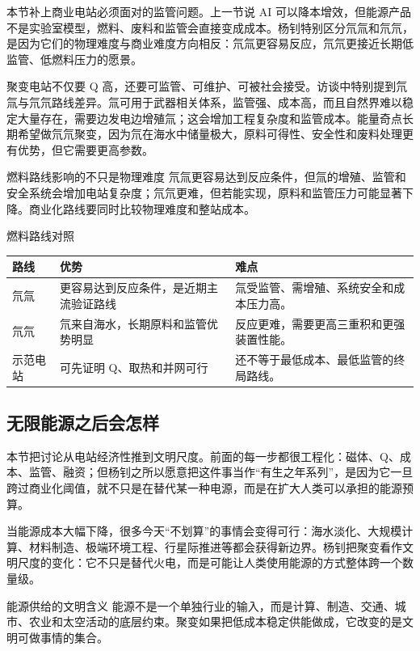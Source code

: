 \documentclass[a4paper]{article}
\begin{document}
本节补上商业电站必须面对的监管问题。上一节说 AI 可以降本增效，但能源产品不是实验室模型，燃料、废料和监管会直接变成成本。杨钊特别区分氘氚和氘氘，是因为它们的物理难度与商业难度方向相反：氘氚更容易反应，氘氘更接近长期低监管、低燃料压力的愿景。

聚变电站不仅要 Q 高，还要可监管、可维护、可被社会接受。访谈中特别提到氘氚与氘氘路线差异。氚可用于武器相关体系，监管强、成本高，而且自然界难以稳定大量存在，需要边发电边增殖氚；这会增加工程复杂度和监管成本。能量奇点长期希望做氘氘聚变，因为氘在海水中储量极大，原料可得性、安全性和废料处理更有优势，但它需要更高参数。

\begin{warningbox}{燃料路线影响的不只是物理难度}
氘氚更容易达到反应条件，但氚的增殖、监管和安全系统会增加电站复杂度；氘氘更难，但若能实现，原料和监管压力可能显著下降。商业化路线要同时比较物理难度和整站成本。
\end{warningbox}

\begin{knowledgebox}{燃料路线对照}
\begin{tabularx}{\textwidth}{p{}p{}X}
\toprule
路线 & 优势 & 难点 \\
\midrule
氘氚 & 更容易达到反应条件，是近期主流验证路线 & 氚受监管、需增殖、系统安全和成本压力高。 \\
氘氘 & 氘来自海水，长期原料和监管优势明显 & 反应更难，需要更高三重积和更强装置性能。 \\
示范电站 & 可先证明 Q、取热和并网可行 & 还不等于最低成本、最低监管的终局路线。 \\
\bottomrule
\end{tabularx}
\end{knowledgebox}

\subsection{无限能源之后会怎样}

本节把讨论从电站经济性推到文明尺度。前面的每一步都很工程化：磁体、Q、成本、监管、融资；但杨钊之所以愿意把这件事当作“有生之年系列”，是因为它一旦跨过商业化阈值，就不只是在替代某一种电源，而是在扩大人类可以承担的能源预算。

当能源成本大幅下降，很多今天“不划算”的事情会变得可行：海水淡化、大规模计算、材料制造、极端环境工程、行星际推进等都会获得新边界。杨钊把聚变看作文明尺度的变化：它不只是替代火电，而是可能让人类使用能源的方式整体跨一个数量级。

\begin{importantbox}{能源供给的文明含义}
能源不是一个单独行业的输入，而是计算、制造、交通、城市、农业和太空活动的底层约束。聚变如果把低成本稳定供能做成，它改变的是文明可做事情的集合。
\end{importantbox}
\end{document}

